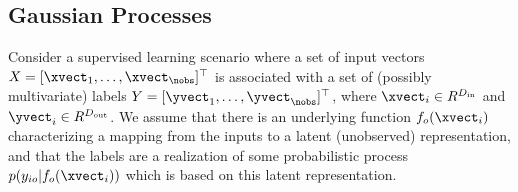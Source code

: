 \subsection{Gaussian Processes}



Consider a supervised learning scenario where a set of input vectors $X = [\xvect_1, \ldots, \xvect_\nobs]^{\top}$ is associated with a set of (possibly multivariate) labels $Y = [\yvect_1, \ldots, \yvect_\nobs]^{\top}$, where $\xvect_i \in R^{D_{\mathrm{in}}}$ and $\yvect_i \in R^{D_{\mathrm{out}}}$.
We assume that there is an underlying function $f_o(\xvect_i)$ characterizing a mapping from the inputs to a latent (unobserved) representation, and that the labels are a realization of some probabilistic process $p(y_{io} | f_o(\xvect_i))$ which is based on this latent representation.

